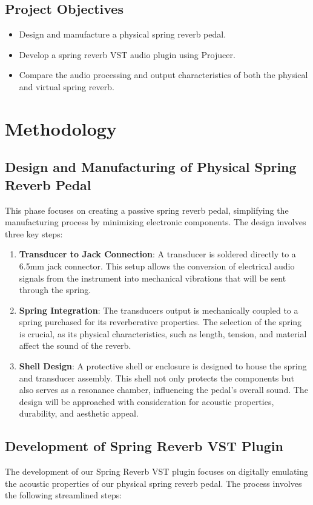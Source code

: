 \documentclass[12pt]{article}
\begin{document}
\subsection{Project Objectives}
\begin{itemize}
    \item Design and manufacture a physical spring reverb pedal.
    \item Develop a spring reverb VST audio plugin using Projucer.
    \item Compare the audio processing and output characteristics of both the physical and virtual spring reverb.
\end{itemize}

\newpage
\section{Methodology}
\subsection{Design and Manufacturing of Physical Spring Reverb Pedal}
This phase focuses on creating a passive spring reverb pedal, simplifying the manufacturing process by minimizing electronic components. The design involves three key steps:
\begin{enumerate}
    \item \textbf{Transducer to Jack Connection}: A transducer is soldered directly to a 6.5mm jack connector. This setup allows the conversion of electrical audio signals from the instrument into mechanical vibrations that will be sent through the spring.
 
    \item \textbf{Spring Integration}: The transducers output is mechanically coupled to a spring purchased for its reverberative properties. The selection of the spring is crucial, as its physical characteristics, such as length, tension, and material affect the sound of the reverb.

    \item \textbf{Shell Design}: A protective shell or enclosure is designed to house the spring and transducer assembly. This shell not only protects the components but also serves as a resonance chamber, influencing the pedal's overall sound. The design will be approached with consideration for acoustic properties, durability, and aesthetic appeal.

\end{enumerate}

\subsection{Development of Spring Reverb VST Plugin}
The development of our Spring Reverb VST plugin focuses on digitally emulating the acoustic properties of our physical spring reverb pedal. The process involves the following streamlined steps:
\end{document}
